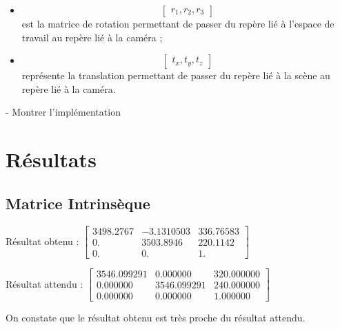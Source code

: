 \documentclass{article}
\begin{document}
\begin{itemize}
\item
\begin{equation}
  \begin{bmatrix}
    r_1, r_2, r_3
  \end{bmatrix}
\end{equation}
est la matrice de rotation permettant de passer du repère lié à l'espace de travail au repère lié à la caméra ;

\item
\begin{equation}
  \begin{bmatrix}
    t_x, t_y, t_z
  \end{bmatrix}
\end{equation}
 représente la translation permettant de passer du repère lié à la scène au repère lié à la caméra.
\end{itemize}

- Montrer l'implémentation


\section{Résultats}

\subsection{Matrice Intrinsèque}

Résultat obtenu :
  $\begin{bmatrix}
      3498.2767 & - 3.1310503  &  336.76583 \\
      0.        &   3503.8946  &  220.1142 \\
      0.        &   0.         &  1.
  \end{bmatrix}$

Résultat attendu :
  $\begin{bmatrix}
    3546.099291 & 0.000000 & 320.000000 \\
    0.000000 & 3546.099291 & 240.000000 \\
    0.000000 & 0.000000 & 1.000000
  \end{bmatrix}$

On constate que le résultat obtenu est très proche du résultat attendu.
\end{document}
